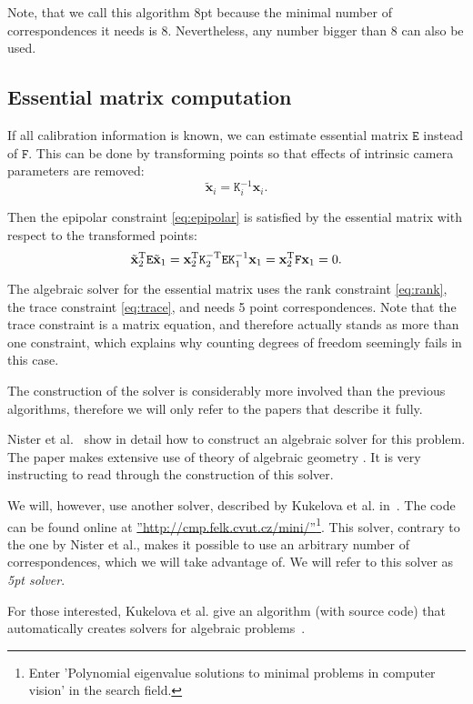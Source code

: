 Note, that we call this algorithm 8pt because the minimal number of correspondences it needs is 8. Nevertheless, any  number bigger than 8 can also be used. 

\subsection{Essential matrix computation}
\label{sec:5pt}
If all calibration information is known, we can estimate essential matrix $\mathtt{E}$ instead of $\mathtt{F}$. This can be done by transforming points so that effects of intrinsic camera parameters are removed: \[\tilde{\mathbf{x}}_i = \mathtt{K}_i^{-1} \mathbf{x}_i. \]

Then the epipolar constraint \ref{eq:epipolar} is satisfied by the essential matrix with respect to the transformed points: \[
\tilde{\mathbf{x}}_2^{\text{T}} \mathtt{E} \tilde{\mathbf{x}}_1 = 
 \mathbf{x}_2^{\text{T}} \mathtt{K}_2^{-\text{T}} \mathtt{E} \mathtt{K}_1^{-1} \mathbf{x}_1 = \mathbf{x}_2^{\text{T}} \mathtt{F} \mathbf{x}_1 = 0. \]

The algebraic solver for the essential matrix uses the rank constraint \ref{eq:rank}, the trace constraint \ref{eq:trace}, and needs 5 point correspondences. Note that the trace constraint is a matrix equation, and therefore actually stands as more than one constraint, which explains why counting degrees of freedom seemingly fails in this case.

The construction of the solver is considerably more involved than the previous algorithms, therefore we will only refer to the papers that describe it fully.

Nister et al.~\cite{Nister5pt} show in detail how to construct an algebraic solver for this problem. The paper makes extensive use of theory of algebraic geometry \cite{Cox1,Cox2}. It is very instructing to read through the construction of this solver.

We will, however, use another solver, described by Kukelova et al. in~\cite{Zuzana5pt}. The code can be found online at \hyperref[http://cmp.felk.cvut.cz/mini/]{''http://cmp.felk.cvut.cz/mini/''}\footnote{Enter 'Polynomial eigenvalue solutions to minimal problems in computer vision' in the search field.}. This solver, contrary to the one by Nister et al., makes it possible to use an arbitrary number of correspondences, which we will take advantage of. We will refer to this solver as \textit{5pt solver}.

For those interested, Kukelova et al. give an algorithm (with source code) that  automatically creates solvers for algebraic problems~\cite{generator}.


